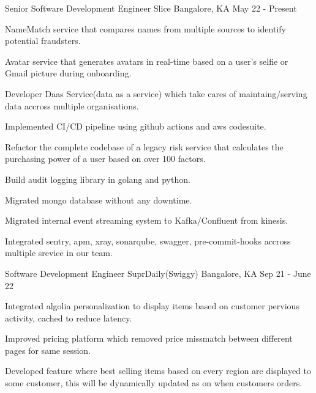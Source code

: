 \begin{cventries}
  \cventry
    {Senior Software Development Engineer}
    {Slice}
    {Bangalore, KA}
    {May 22 - Present}
    {
      \begin{cvitems}
        \item {NameMatch service that compares names from multiple sources to identify potential fraudsters.}
        \item {Avatar service that generates avatars in real-time based on a user's selfie or Gmail picture during onboarding.}
        \item {Developer Daas Service(data as a service) which take cares of maintaing/serving data accross multiple organisations.}
        \item {Implemented CI/CD pipeline using github actions and aws codesuite.}
        \item {Refactor the complete codebase of a legacy risk service that calculates the purchasing power of a user based on over 100 factors.}
        \item {Build audit logging library in golang and python.}
        \item {Migrated mongo database without any downtime.}
        \item {Migrated internal event streaming system to Kafka/Confluent from kinesis.}
        \item {Integrated sentry, apm, xray, sonarqube, swagger, pre-commit-hooks accross multiple srevice in our team.}
      \end{cvitems}
    }
  
  \cventry
    {Software Development Engineer}
    {SuprDaily(Swiggy)}
    {Bangalore, KA}
    {Sep 21 - June 22}
    {
      \begin{cvitems}
        \item {Integrated algolia personalization to display items based on customer pervious activity, cached to reduce latency.}
        \item {Improved pricing platform which removed price missmatch between different pages for same session.}
        \item {Developed feature where best selling items based on every region are displayed to some customer, this will be dynamically updated as on when customers orders.}
      \end{cvitems}
    }
  

\end{cventries}
